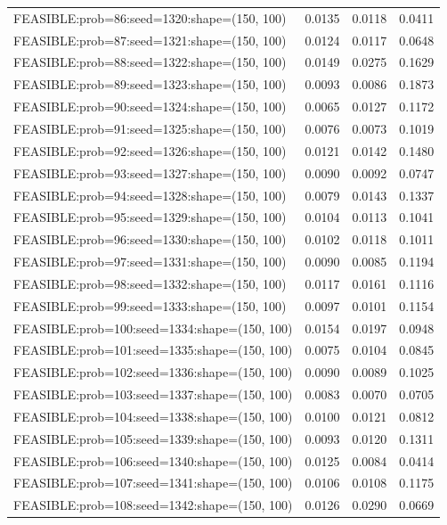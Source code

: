 \begin{longtable}{lccc}
FEASIBLE:prob=86:seed=1320:shape=(150, 100)  & 0.0135 & 0.0118 & 0.0411 \\
FEASIBLE:prob=87:seed=1321:shape=(150, 100)  & 0.0124 & 0.0117 & 0.0648 \\
FEASIBLE:prob=88:seed=1322:shape=(150, 100)  & 0.0149 & 0.0275 & 0.1629 \\
FEASIBLE:prob=89:seed=1323:shape=(150, 100)  & 0.0093 & 0.0086 & 0.1873 \\
FEASIBLE:prob=90:seed=1324:shape=(150, 100)  & 0.0065 & 0.0127 & 0.1172 \\
FEASIBLE:prob=91:seed=1325:shape=(150, 100)  & 0.0076 & 0.0073 & 0.1019 \\
FEASIBLE:prob=92:seed=1326:shape=(150, 100)  & 0.0121 & 0.0142 & 0.1480 \\
FEASIBLE:prob=93:seed=1327:shape=(150, 100)  & 0.0090 & 0.0092 & 0.0747 \\
FEASIBLE:prob=94:seed=1328:shape=(150, 100)  & 0.0079 & 0.0143 & 0.1337 \\
FEASIBLE:prob=95:seed=1329:shape=(150, 100)  & 0.0104 & 0.0113 & 0.1041 \\
FEASIBLE:prob=96:seed=1330:shape=(150, 100)  & 0.0102 & 0.0118 & 0.1011 \\
FEASIBLE:prob=97:seed=1331:shape=(150, 100)  & 0.0090 & 0.0085 & 0.1194 \\
FEASIBLE:prob=98:seed=1332:shape=(150, 100)  & 0.0117 & 0.0161 & 0.1116 \\
FEASIBLE:prob=99:seed=1333:shape=(150, 100)  & 0.0097 & 0.0101 & 0.1154 \\
FEASIBLE:prob=100:seed=1334:shape=(150, 100) & 0.0154 & 0.0197 & 0.0948 \\
FEASIBLE:prob=101:seed=1335:shape=(150, 100) & 0.0075 & 0.0104 & 0.0845 \\
FEASIBLE:prob=102:seed=1336:shape=(150, 100) & 0.0090 & 0.0089 & 0.1025 \\
FEASIBLE:prob=103:seed=1337:shape=(150, 100) & 0.0083 & 0.0070 & 0.0705 \\
FEASIBLE:prob=104:seed=1338:shape=(150, 100) & 0.0100 & 0.0121 & 0.0812 \\
FEASIBLE:prob=105:seed=1339:shape=(150, 100) & 0.0093 & 0.0120 & 0.1311 \\
FEASIBLE:prob=106:seed=1340:shape=(150, 100) & 0.0125 & 0.0084 & 0.0414 \\
FEASIBLE:prob=107:seed=1341:shape=(150, 100) & 0.0106 & 0.0108 & 0.1175 \\
FEASIBLE:prob=108:seed=1342:shape=(150, 100) & 0.0126 & 0.0290 & 0.0669 \\

\end{longtable}

